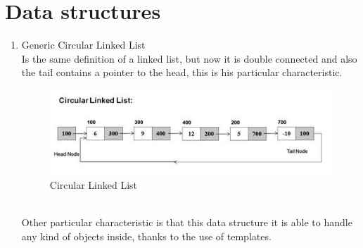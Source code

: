 \documentclass[twocolumn]{IEEEtran}
\begin{document}
\section{Data structures}

	\begin{enumerate}
		\item Generic Circular Linked List\\
        
        Is the same definition of a linked list, but now it is double connected and also the 
        tail contains a pointer to the head, this is his particular characteristic.
     	   \begin{figure}[h!]
				\centering
				\includegraphics[width=\columnwidth]{src/circularLinkedList.jpg}
				\caption{Circular Linked List}
			\end{figure}\\
		Other particular characteristic is that this data structure it is able to handle any 
        kind of objects inside, thanks to the use of templates.
        
	\end{enumerate}
    
    
    
    
\end{document}
